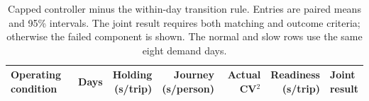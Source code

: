 \begin{table}[t]
\centering
\caption{Capped controller minus the within-day transition rule. Entries are paired means and 95\% intervals. The joint result requires both matching and outcome criteria; otherwise the failed component is shown. The normal and slow rows use the same eight demand days.}
\label{tab:matched}
\small
\setlength{\tabcolsep}{4pt}
\renewcommand{\arraystretch}{1.15}
\begin{tabular}{@{}lr rrrr l@{}}
\toprule
Operating condition & Days & \shortstack[r]{Holding\\(s/trip)}
& \shortstack[r]{Journey\\(s/person)} & \shortstack[r]{Actual\\CV$^2$}
& \shortstack[r]{Readiness\\(s/trip)} & \shortstack[l]{Joint\\result} \\
\midrule

\end{tabular}
\end{table}
